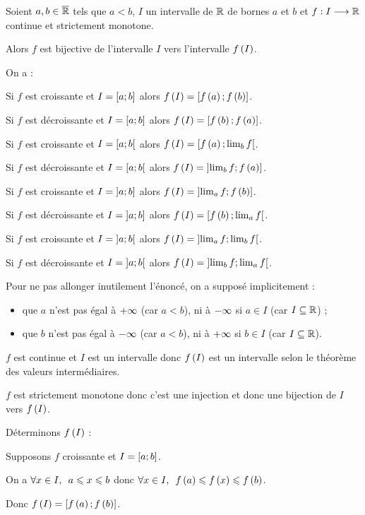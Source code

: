 \begin{cor}
Soient \(a,b\in\overline{\mathbb{R}}\) tels que \(a<b\), \(I\) un intervalle de \(\mathbb{R}\) de bornes \(a\) et \(b\) et \(f:I\longrightarrow\mathbb{R}\) continue et strictement monotone.

Alors \(f\) est bijective de l'intervalle \(I\) vers l'intervalle \(f\left(I\right)\).

On a :

Si \(f\) est croissante et \(I=\intervii{a}{b}\) alors \(f\left(I\right)=\left[f\left(a\right);f\left(b\right)\right]\).

Si \(f\) est décroissante et \(I=\intervii{a}{b}\) alors \(f\left(I\right)=\left[f\left(b\right);f\left(a\right)\right]\).

Si \(f\) est croissante et \(I=\left[a;b\right[\) alors \(f\left(I\right)=\left[f\left(a\right);\lim_bf\right[\).

Si \(f\) est décroissante et \(I=\left[a;b\right[\) alors \(f\left(I\right)=\left]\lim_bf;f\left(a\right)\right]\).

Si \(f\) est croissante et \(I=\left]a;b\right]\) alors \(f\left(I\right)=\left]\lim_af;f\left(b\right)\right]\).

Si \(f\) est décroissante et \(I=\left]a;b\right]\) alors \(f\left(I\right)=\left[f\left(b\right);\lim_af\right[\).

Si \(f\) est croissante et \(I=\left]a;b\right[\) alors \(f\left(I\right)=\left]\lim_af;\lim_bf\right[\).

Si \(f\) est décroissante et \(I=\left]a;b\right[\) alors \(f\left(I\right)=\left]\lim_bf;\lim_af\right[\).

{
\small Pour ne pas allonger inutilement l'énoncé, on a supposé implicitement :

\begin{itemize}
\item que \(a\) n'est pas égal à \(+\infty\) (car \(a<b\)), ni à \(-\infty\) si \(a\in I\) (car \(I\subseteq\mathbb{R}\)) ; \\

\item que \(b\) n'est pas égal à \(-\infty\) (car \(a<b\)), ni à \(+\infty\) si \(b\in I\) (car \(I\subseteq\mathbb{R}\)).
\end{itemize}
}
\end{cor}

\begin{dem}[Cas où \(f\) est croissante et \(I=\intervii{a}{b}\)]
\(f\) est continue et \(I\) est un intervalle donc \(f\left(I\right)\) est un intervalle selon le théorème des valeurs intermédiaires.

\(f\) est strictement monotone donc c'est une injection et donc une bijection de \(I\) vers \(f\left(I\right)\).

Déterminons \(f\left(I\right)\) :

Supposons \(f\) croissante et \(I=\intervii{a}{b}\).

On a \(\quantifs{\forall x\in I}a\leq x\leq b\) donc \(\quantifs{\forall x\in I}f\paren{a}\leq f\paren{x}\leq f\paren{b}\).

Donc \(f\left(I\right)=\left[f\left(a\right);f\left(b\right)\right]\).
\end{dem}

